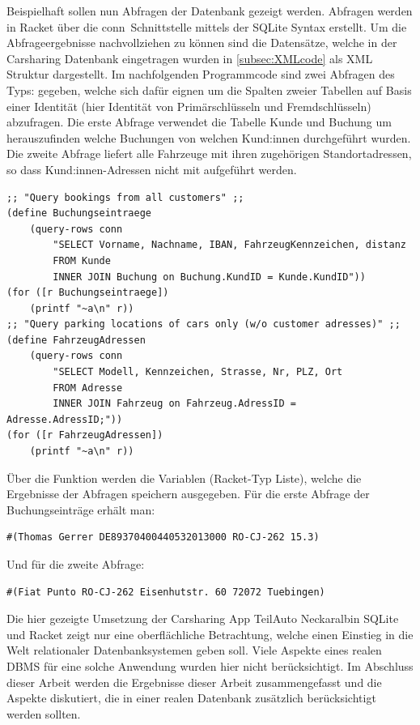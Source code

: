 Beispielhaft sollen nun Abfragen der Datenbank gezeigt werden. Abfragen werden in Racket über die \glqq conn\grqq\ Schnittstelle mittels der SQLite Syntax erstellt. Um die Abfrageergebnisse nachvollziehen zu können sind die Datensätze, welche in der Carsharing Datenbank eingetragen wurden in \autoref{subsec:XMLcode} als XML Struktur dargestellt. Im nachfolgenden Programmcode sind zwei Abfragen des Typs:  gegeben, welche sich dafür eignen um die Spalten zweier Tabellen auf Basis einer Identität (hier Identität von Primärschlüsseln und Fremdschlüsseln) abzufragen. Die erste Abfrage verwendet die Tabelle Kunde und Buchung um herauszufinden welche Buchungen von welchen Kund:innen durchgeführt wurden. Die zweite Abfrage liefert alle Fahrzeuge mit ihren zugehörigen Standortadressen, so dass Kund:innen-Adressen nicht mit aufgeführt werden.
\begin{lstlisting}[language=racketSQL]
;; "Query bookings from all customers" ;;
(define Buchungseintraege
	(query-rows conn
		"SELECT Vorname, Nachname, IBAN, FahrzeugKennzeichen, distanz
		FROM Kunde
		INNER JOIN Buchung on Buchung.KundID = Kunde.KundID"))
(for ([r Buchungseintraege])
	(printf "~a\n" r))
;; "Query parking locations of cars only (w/o customer adresses)" ;;
(define FahrzeugAdressen
	(query-rows conn
		"SELECT Modell, Kennzeichen, Strasse, Nr, PLZ, Ort
		FROM Adresse
		INNER JOIN Fahrzeug on Fahrzeug.AdressID = Adresse.AdressID;"))
(for ([r FahrzeugAdressen])
	(printf "~a\n" r))
\end{lstlisting}

Über die  Funktion werden die Variablen (Racket-Typ Liste), welche die Ergebnisse der Abfragen speichern ausgegeben. Für die erste Abfrage der Buchungseinträge erhält man:
\begin{lstlisting}[language=racketSQL]
#(Thomas Gerrer DE89370400440532013000 RO-CJ-262 15.3)
\end{lstlisting}
Und für die zweite Abfrage:
\begin{lstlisting}[language=racketSQL]
#(Fiat Punto RO-CJ-262 Eisenhutstr. 60 72072 Tuebingen)
\end{lstlisting}

Die hier gezeigte Umsetzung der Carsharing App \glqq TeilAuto Neckaralb\grqq in SQLite und Racket zeigt nur eine oberflächliche Betrachtung, welche einen Einstieg in die Welt relationaler Datenbanksystemen geben soll. Viele Aspekte eines realen DBMS für eine solche Anwendung wurden hier nicht berücksichtigt. Im Abschluss dieser Arbeit werden die Ergebnisse dieser Arbeit zusammengefasst und die Aspekte diskutiert, die in einer realen Datenbank zusätzlich berücksichtigt werden sollten.






























